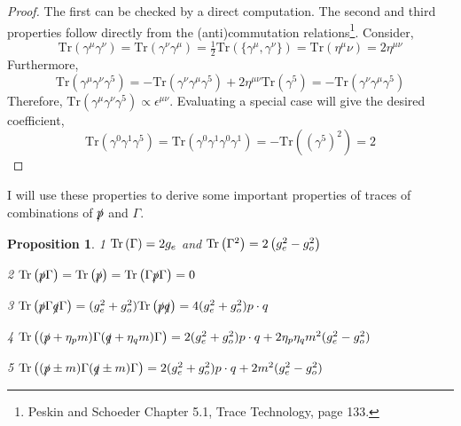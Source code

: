 \documentclass[12pt]{article}
\newcommand{\tr}[1]{\mathrm{Tr} \left( #1 \right)}
\newtheorem{proposition}[theorem]{Proposition}
\begin{document}
\begin{proof}
The first can be checked by a direct computation. The second and third properties follow directly from the (anti)commutation relations\footnote{Peskin and Schoeder Chapter 5.1, Trace Technology, page 133.}.
Consider,
\[ \tr{\gamma^\mu \gamma^\nu} = \tr{\gamma^\nu \gamma^\mu} = \tfrac{1}{2} \tr{ \{ \gamma^\mu, \gamma^\nu \} } = \tr{\eta^\mu \nu} = 2 \eta^{\mu \nu} \]
Furthermore,
\[ \tr{\gamma^\mu \gamma^\nu \gamma^5} = -\tr{\gamma^\nu \gamma^\mu \gamma^5} + 2 \eta^{\mu \nu} \tr{\gamma^5} = - \tr{\gamma^\nu \gamma^\mu \gamma^5} \]
Therefore, $\tr{\gamma^\mu \gamma^\nu \gamma^5}  \propto \epsilon^{\mu \nu}$. Evaluating a special case will give the desired coefficient,
\[ \tr{\gamma^0 \gamma^1 \gamma^5} = \tr{\gamma^0 \gamma^1 \gamma^0 \gamma^1} = - \tr{(\gamma^5)^2} = 2\]
\end{proof}
\noindent
I will use these properties to derive some important properties of traces of combinations of $\slashed{p}$ and $\Gamma$. 

\begin{proposition}

\item[1] $ \tr{ \Gamma } = 2 \gs $ and $\tr{ \Gamma^2 } = 2 \left( \gs^2 - \gp^2 \right)$ 

\item[2] $ \tr{ \slashed{p} \Gamma } = \tr{ \slashed{p} } = \tr{ \Gamma \slashed{p} \Gamma } = 0 $ 

\item[3] $  \tr{ \slashed{p} \Gamma \slashed{q} \Gamma } = (\gs^2 + \gp^2) \tr{ \slashed{p} \slashed{q} } = 4 (\gs^2 + \gp^2) p \cdot q $

\item[4] $\tr{ (\slashed{p} + \eta_p m) \Gamma (\slashed{q} + \eta_q m) \Gamma } = 2 ( \gs^2 + \gp^2) p \cdot q + 2 \eta_p \eta_q m^2 (\gs^2 - \gp^2) $

\item[5] $\tr{ (\slashed{p} \pm m) \Gamma (\slashed{q} \pm m) \Gamma } = 2 ( \gs^2 + \gp^2) p \cdot q + 2 m^2 (\gs^2 - \gp^2)$ 
\end{proposition}
\end{document}
